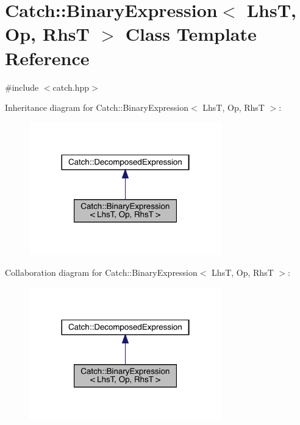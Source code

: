 \hypertarget{class_catch_1_1_binary_expression}{}\section{Catch\+:\+:Binary\+Expression$<$ LhsT, Op, RhsT $>$ Class Template Reference}
\label{class_catch_1_1_binary_expression}


{\ttfamily \#include $<$catch.\+hpp$>$}



Inheritance diagram for Catch\+:\+:Binary\+Expression$<$ LhsT, Op, RhsT $>$\+:
\nopagebreak
\begin{figure}[H]
\begin{center}
\leavevmode
\includegraphics[width=236pt]{class_catch_1_1_binary_expression__inherit__graph}
\end{center}
\end{figure}


Collaboration diagram for Catch\+:\+:Binary\+Expression$<$ LhsT, Op, RhsT $>$\+:
\nopagebreak
\begin{figure}[H]
\begin{center}
\leavevmode
\includegraphics[width=236pt]{class_catch_1_1_binary_expression__coll__graph}
\end{center}
\end{figure}
